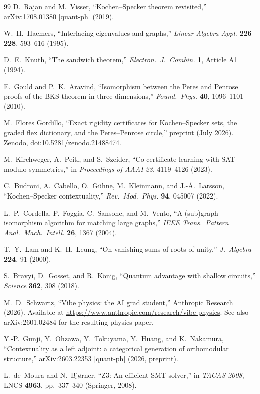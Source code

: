 \documentclass[12pt,a4paper]{article}
\begin{document}
\begin{thebibliography}{99}
D.~Rajan and M.~Visser,
``Kochen--Specker theorem revisited,''
arXiv:1708.01380 [quant-ph] (2019).

W.~H.~Haemers,
``Interlacing eigenvalues and graphs,''
\textit{Linear Algebra Appl.} \textbf{226--228}, 593--616 (1995).

D.~E.~Knuth,
``The sandwich theorem,''
\textit{Electron.\ J.\ Combin.} \textbf{1}, Article A1 (1994).

E.~Gould and P.~K.~Aravind,
``Isomorphism between the Peres and Penrose proofs of the BKS theorem in three dimensions,''
\textit{Found.\ Phys.} \textbf{40}, 1096--1101 (2010).

M.~Flores Gordillo,
``Exact rigidity certificates for Kochen--Specker sets, the graded flex dictionary, and the Peres--Penrose circle,''
preprint (July 2026).
Zenodo, doi:10.5281/zenodo.21488474.

M.~Kirchweger, A.~Peitl, and S.~Szeider,
``Co-certificate learning with SAT modulo symmetries,''
in \textit{Proceedings of AAAI-23}, 4119--4126 (2023).

C.~Budroni, A.~Cabello, O.~G\"uhne, M.~Kleinmann, and J.-\AA.~Larsson,
``Kochen--Specker contextuality,''
\textit{Rev.\ Mod.\ Phys.} \textbf{94}, 045007 (2022).

L.~P.~Cordella, P.~Foggia, C.~Sansone, and M.~Vento,
``A (sub)graph isomorphism algorithm for matching large graphs,''
\textit{IEEE Trans.\ Pattern Anal.\ Mach.\ Intell.} \textbf{26}, 1367 (2004).

T.~Y.~Lam and K.~H.~Leung,
``On vanishing sums of roots of unity,''
\textit{J.\ Algebra} \textbf{224}, 91 (2000).

S.~Bravyi, D.~Gosset, and R.~K\"onig,
``Quantum advantage with shallow circuits,''
\textit{Science} \textbf{362}, 308 (2018).

M.~D.~Schwartz,
``Vibe physics: the AI grad student,''
Anthropic Research (2026).
Available at \url{https://www.anthropic.com/research/vibe-physics}.
See also arXiv:2601.02484 for the resulting physics paper.

Y.-P.~Gunji, Y.~Ohzawa, Y.~Tokuyama, Y.~Huang, and K.~Nakamura,
``Contextuality as a left adjoint: a categorical generation of orthomodular structure,''
arXiv:2603.22353 [quant-ph] (2026, preprint).

L.~de~Moura and N.~Bj{\o}rner,
``Z3: An efficient SMT solver,''
in \textit{TACAS 2008}, LNCS \textbf{4963}, pp.~337--340 (Springer, 2008).

\end{thebibliography}
\end{document}
